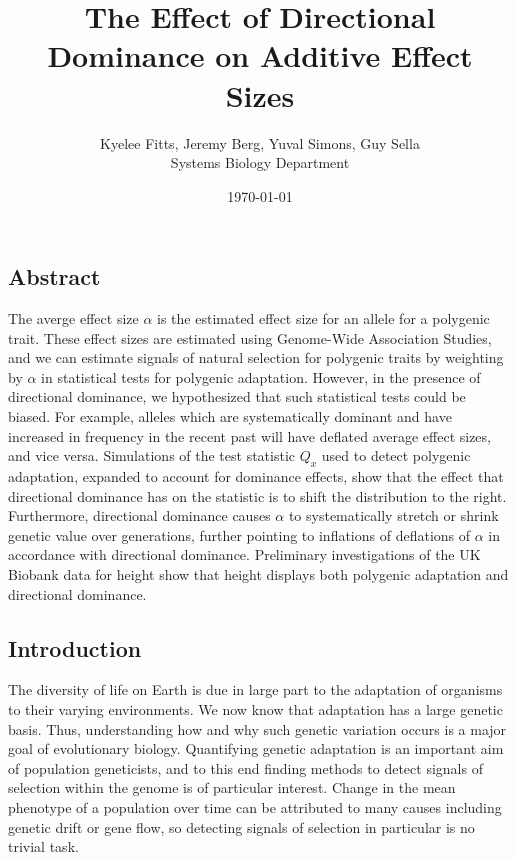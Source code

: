 \documentclass[a4paper,12pt]{article}
\begin{document}
\title{\vspace{-2cm}
  The Effect of Directional Dominance on Additive Effect Sizes
}
\author{\normalsize{Kyelee Fitts, Jeremy Berg, Yuval Simons, Guy
    Sella \\
  \small{Systems Biology Department}}}
\date{\normalsize{\today}}
\maketitle



\subsection*{Abstract}
The averge effect size $\alpha$ is the estimated effect size for an
allele for a polygenic trait. These effect sizes are estimated using
Genome-Wide Association Studies, and we can estimate signals of natural
selection for polygenic traits by weighting by $\alpha$ in statistical
tests for polygenic adaptation. However, in the presence of
directional dominance, we hypothesized that such statistical tests
could be biased. For example, alleles which are systematically
dominant and have increased in frequency in the recent past will have
deflated average effect sizes, and vice versa. Simulations of the test
statistic $Q_x$ used to detect polygenic adaptation, expanded to
account for dominance effects, show that the effect that directional
dominance has on the statistic is to shift the distribution to the
right. Furthermore, directional dominance causes $\alpha$ to
systematically stretch or shrink genetic value over generations,
further pointing to inflations of deflations of $\alpha$ in accordance
with directional dominance. Preliminary investigations of the UK
Biobank data for height show that height displays both polygenic
adaptation and directional dominance.


\subsection*{Introduction}

The diversity of life on Earth is due in large part to the
adaptation of organisms to their varying environments. We now know that
adaptation has a large genetic basis. Thus, understanding how and why such
genetic variation occurs is a major goal of evolutionary
biology. Quantifying genetic adaptation is an important aim of population
geneticists, and to this end finding methods to detect signals of
selection within the genome is of particular interest. Change in the
mean phenotype of a population over time can be attributed to many causes including genetic
drift or gene flow, so detecting signals of selection in
particular is no trivial task.
\end{document}
